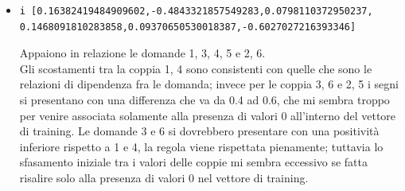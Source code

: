 \begin{itemize}
\item \begin{verbatim}i [0.16382419484909602,-0.4843321857549283,0.0798110372950237,
0.1468091810283858,0.09370650530018387,-0.6027027216393346]
\end{verbatim}
Appaiono in relazione le domande 1, 3, 4, 5 e 2, 6.\\
Gli scostamenti tra la coppia 1, 4 sono consistenti con quelle che sono le relazioni di dipendenza fra le domanda; invece per le coppia 3, 6 e 2, 5 i segni si presentano con una differenza che va da 0.4 ad 0.6, che mi sembra troppo per venire associata solamente alla presenza di valori 0 all'interno del vettore di training.
Le domande 3 e 6 si dovrebbero presentare con una positivit\`a inferiore rispetto a 1 e 4, la regola viene rispettata pienamente; tuttavia lo sfasamento iniziale tra i valori delle coppie mi sembra eccessivo se fatta risalire solo alla presenza di valori 0 nel vettore di training.
\end{itemize}

